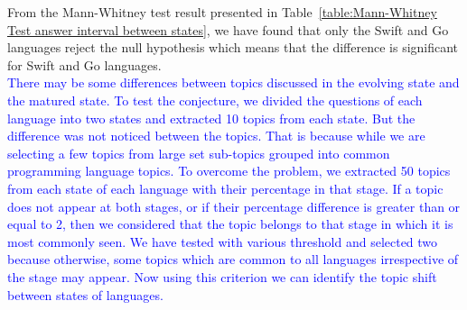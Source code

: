 From the Mann-Whitney test result presented in Table~\ref{table:Mann-Whitney Test answer interval between states}, we have found that only the Swift and Go languages reject the null hypothesis which means that the difference is significant for Swift and Go languages.\\
\textcolor{blue}{There may be some differences between topics discussed in the evolving state and the matured state. To test the conjecture, we divided the questions of each language into two states and extracted 10 topics from each state. But the difference was not noticed between the topics. That is because while we are selecting a few topics from large set sub-topics grouped into common programming language topics. To overcome the problem, we extracted 50 topics from each state of each language with their percentage in that stage. If a topic does not appear at both stages, or if their percentage difference is greater than or equal to 2, then we considered that the topic belongs to that stage in which it is most commonly seen. We have tested with various threshold and selected two because otherwise, some topics which are common to all languages irrespective of the stage may appear. Now using this criterion we can identify the topic shift between states of languages.}
